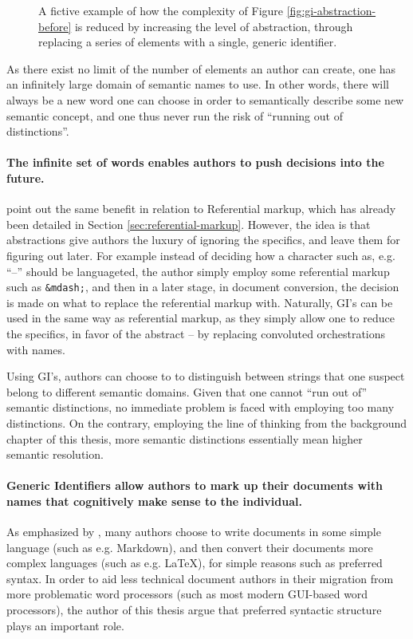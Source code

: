 \documentclass{scrreprt}
\begin{document}
\begin{figure}[h]
\centering
{}
\caption{A fictive example of how the complexity of Figure \ref{fig:gi-abstraction-before} is reduced by increasing the level of abstraction, through replacing a series of elements with a single, generic identifier.}
\label{fig:gi-abstraction-after}
\end{figure}


As there exist no limit of the number of elements an author can create, one has an infinitely large domain of semantic names to use. In other words, there will always be a new word one can choose in order to semantically describe some new semantic concept, and one thus never run the risk of ``running out of distinctions''.

\paragraph{The infinite set of words enables authors to push decisions into the future.} \citet{coombs} point out the same benefit in relation to Referential markup, which has already been detailed in Section \ref{sec:referential-markup}. However, the idea is that abstractions give authors the luxury of ignoring the specifics, and leave them for figuring out later. For example instead of deciding how a character such as, e.g. ``--'' should be languageted, the author simply employ some referential markup such as \texttt{\&mdash;}, and then in a later stage, in document conversion, the decision is made on what to replace the referential markup with. Naturally, GI's can be used in the same way as referential markup, as they simply allow one to reduce the specifics, in favor of the abstract -- by replacing convoluted orchestrations with names.

Using GI's, authors can choose to to distinguish between strings that one suspect belong to different semantic domains. Given that one cannot ``run out of'' semantic distinctions, no immediate problem is faced with employing too many distinctions. On the contrary, employing the line of thinking from the background chapter of this thesis, more semantic distinctions essentially mean higher semantic resolution. 

\paragraph{Generic Identifiers allow authors to mark up their documents with names that cognitively make sense to the individual.} As emphasized by \citet{krijnen}, many authors choose to write documents in some simple language (such as e.g. Markdown), and then convert their documents more complex languages (such as e.g. \LaTeX{}), for simple reasons such as preferred syntax. In order to aid less technical document authors in their migration from more problematic word processors (such as most modern GUI-based word processors), the author of this thesis argue that preferred syntactic structure plays an important role.
\end{document}
